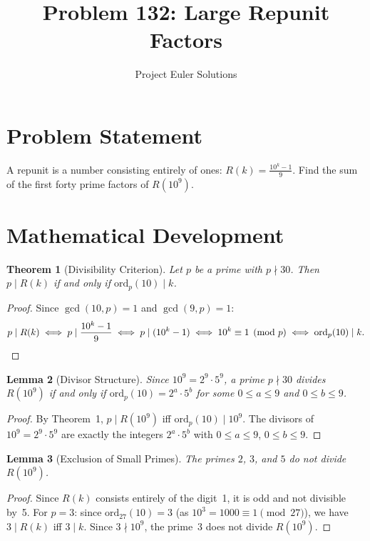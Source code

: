 \documentclass[12pt]{article}
\title{Problem 132: Large Repunit Factors}
\author{Project Euler Solutions}
\date{}
\newtheorem{theorem}{Theorem}
\newtheorem{lemma}[theorem]{Lemma}
\begin{document}
\maketitle

\section{Problem Statement}
A repunit is a number consisting entirely of ones: $R(k) = \frac{10^k - 1}{9}$. Find the sum of the first forty prime factors of $R(10^9)$.

\section{Mathematical Development}

\begin{theorem}[Divisibility Criterion]
Let $p$ be a prime with $p \nmid 30$. Then $p \mid R(k)$ if and only if $\mathrm{ord}_p(10) \mid k$.
\end{theorem}

\begin{proof}
Since $\gcd(10, p) = 1$ and $\gcd(9, p) = 1$:
\[
p \mid R(k) \iff p \mid \frac{10^k - 1}{9} \iff p \mid (10^k - 1) \iff 10^k \equiv 1 \pmod{p} \iff \mathrm{ord}_p(10) \mid k. \qedhere
\]
\end{proof}

\begin{lemma}[Divisor Structure]
Since $10^9 = 2^9 \cdot 5^9$, a prime $p \nmid 30$ divides $R(10^9)$ if and only if $\mathrm{ord}_p(10) = 2^a \cdot 5^b$ for some $0 \leq a \leq 9$ and $0 \leq b \leq 9$.
\end{lemma}

\begin{proof}
By Theorem~1, $p \mid R(10^9)$ iff $\mathrm{ord}_p(10) \mid 10^9$. The divisors of $10^9 = 2^9 \cdot 5^9$ are exactly the integers $2^a \cdot 5^b$ with $0 \leq a \leq 9$, $0 \leq b \leq 9$.
\end{proof}

\begin{lemma}[Exclusion of Small Primes]
The primes $2$, $3$, and $5$ do not divide $R(10^9)$.
\end{lemma}

\begin{proof}
Since $R(k)$ consists entirely of the digit~1, it is odd and not divisible by~5. For $p = 3$: since $\mathrm{ord}_{27}(10) = 3$ (as $10^3 = 1000 \equiv 1 \pmod{27}$), we have $3 \mid R(k)$ iff $3 \mid k$. Since $3 \nmid 10^9$, the prime~3 does not divide $R(10^9)$.
\end{proof}
\end{document}
